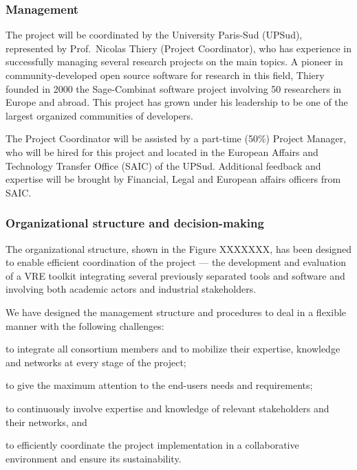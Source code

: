 \label{sect:mgt}

\subsubsection{Management}

The project will be coordinated by the University Paris-Sud (UPSud),
represented by Prof.~Nicolas Thiery (Project Coordinator), who has
experience in successfully managing several research projects on the
main \TheProject topics.  A pioneer in community-developed open source
software for research in this field, Thiery founded in 2000 the
Sage-Combinat software project involving 50 researchers in Europe and
abroad.  This project has grown under his leadership to be one of the
largest organized communities of \Sage developers.

The Project Coordinator will be assisted by a part-time (50\%) Project
Manager, who will be hired for this project and located in the
European Affairs and Technology Transfer Office (SAIC) of the UPSud.
Additional feedback and expertise will be brought by Financial, Legal
and European affairs officers from SAIC.

\subsubsection{Organizational structure and decision-making}


The organizational structure, shown in the Figure XXXXXXX, has been designed
to enable efficient coordination of the \TheProject project --- the
development and evaluation of a VRE toolkit
integrating several previously separated tools and software and
involving both academic actors and industrial stakeholders.

We have designed the management structure and procedures to deal in a
flexible manner with the following challenges:

\begin{compactitem}
\item to integrate all consortium members and to mobilize their
  expertise, knowledge and networks at every stage of the project;
\item to give the maximum attention to the end-users needs and
  requirements;
\item to continuously involve expertise and knowledge of relevant
  stakeholders and their networks, and
\item to efficiently coordinate the project implementation in a
  collaborative environment and ensure its sustainability.
\end{compactitem}

